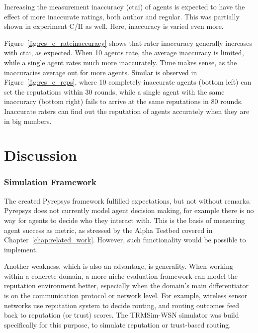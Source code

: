 \documentclass[%
    ]{\PathToTumTemplate/thesis/tum_thesis}
\begin{document}
Increasing the measurement inaccuracy (\gls{ctai}) of agents is expected to have the effect of more inaccurate ratings, both author and regular.
This was partially shown in experiment C/II as well.
Here, inaccuracy is varied even more.

Figure~\ref{fig:res_e_rateinaccuracy} shows that rater inaccuracy generally increases with \gls{ctai}, as expected.
When 10 agents rate, the average inaccuracy is limited, while a single agent rates much more inaccurately.
Time makes sense, as the inaccuracies average out for more agents.
Similar is observed in Figure~\ref{fig:res_e_reps}, where 10 completely inaccurate agents (bottom left) can set the reputations within 30 rounds, while a single agent with the same inaccuracy (bottom right) fails to arrive at the same reputations in 80 rounds.
Inaccurate raters can find out the reputation of agents accurately when they are in big numbers.



\section{Discussion}\label{sec:discussion}


\subsubsection{Simulation Framework}
The created Pyrepsys framework fulfilled expectations, but not without remarks.
Pyrepsys does not currently model agent decision making, for example there is no way for agents to decide who they interact with.
This is the basis of measuring agent success as metric, as stressed by the Alpha Testbed covered in Chapter~\ref{chap:related_work}.
However, such functionality would be possible to implement.

Another weakness, which is also an advantage, is generality.
When working within a concrete domain, a more niche evaluation framework can model the reputation environment better, especially when the domain's main differentiator is on the communication protocol or network level.
For example, wireless sensor networks use reputation system to decide routing, and routing outcomes feed back to reputation (or trust) scores.
The TRMSim-WSN simulator was build specifically for this purpose, to simulate reputation or trust-based routing\cite{marmol_trmsim-wsn_2009}.
\end{document}
